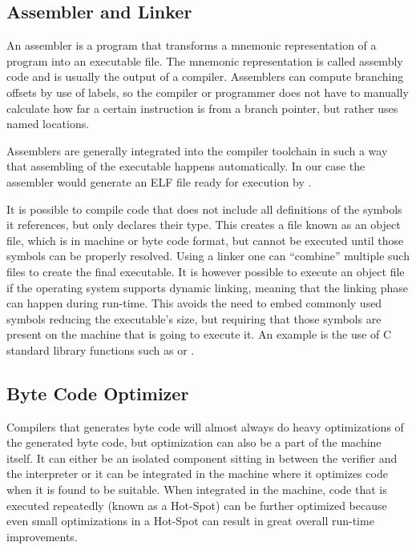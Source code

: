 \subsection{Assembler and Linker}

An assembler is a program that transforms a mnemonic representation of a program
into an executable file. The mnemonic representation is called assembly code and
is usually the output of a compiler. Assemblers can compute branching offsets by
use of labels, so the compiler or programmer does not have to manually calculate
how far a certain instruction is from a branch pointer, but rather uses named
locations.

Assemblers are generally integrated into the compiler toolchain in such a way
that assembling of the executable happens automatically. In our case the
assembler would generate an ELF file ready for execution by \thename{}.

It is possible to compile code that does not include all definitions of the
symbols it references, but only declares their type. This creates a file known
as an object file, which is in machine or byte code format, but cannot be
executed until those symbols can be properly resolved. Using a linker one can
``combine'' multiple such files to create the final executable. It is however
possible to execute an object file if the operating system supports dynamic
linking, meaning that the linking phase can happen during run-time. This avoids
the need to embed commonly used symbols reducing the executable's size, but
requiring that those symbols are present on the machine that is going to execute
it. An example is the use of C standard library functions such as 
or .

\subsection{Byte Code Optimizer}

Compilers that generates byte code will almost always do heavy optimizations of
the generated byte code, but optimization can also be a part of the machine
itself. It can either be an isolated component sitting in between the verifier
and the interpreter or it can be integrated in the machine where it optimizes
code when it is found to be suitable. When integrated in the machine, code that
is executed repeatedly (known as a Hot-Spot) can be further optimized because
even small optimizations in a Hot-Spot can result in great overall run-time
improvements.

